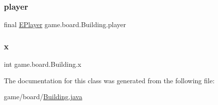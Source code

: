 \subsubsection{\texorpdfstring{player}{player}}
{\footnotesize\ttfamily final \mbox{\hyperlink{enumgame_1_1_e_player}{E\+Player}} game.\+board.\+Building.\+player\hspace{0.3cm}{\ttfamily [private]}}

\mbox{\label{classgame_1_1board_1_1_building_a8893575c63f6eb2481a06061eade1263}} 
\subsubsection{\texorpdfstring{x}{x}}
{\footnotesize\ttfamily int game.\+board.\+Building.\+x\hspace{0.3cm}{\ttfamily [private]}}



The documentation for this class was generated from the following file\+:\begin{DoxyCompactItemize}
\item 
game/board/\mbox{\hyperlink{_building_8java}{Building.\+java}}\end{DoxyCompactItemize}
